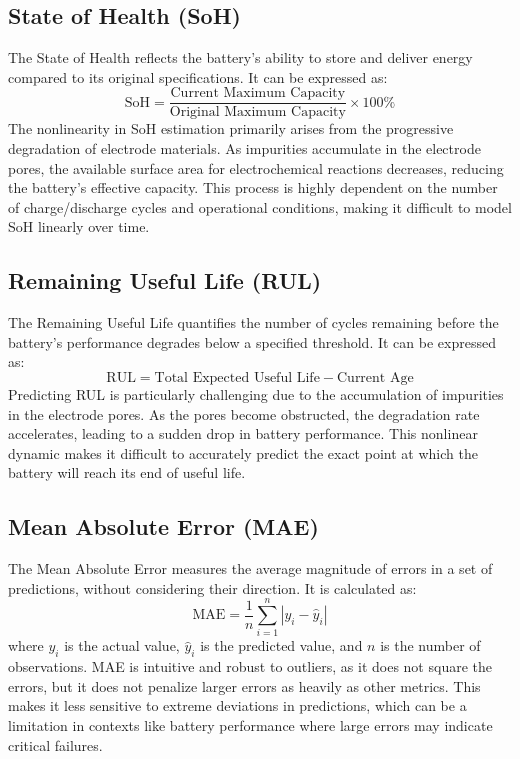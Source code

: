 \subsection{State of Health (SoH)}
The State of Health reflects the battery's ability to store and deliver energy compared to its original specifications. It can be expressed as:
\[
\text{SoH} = \frac{\text{Current Maximum Capacity}}{\text{Original Maximum Capacity}} \times 100\%
\]
The nonlinearity in SoH estimation primarily arises from the progressive degradation of electrode materials. As impurities accumulate in the electrode pores, the available surface area for electrochemical reactions decreases, reducing the battery's effective capacity. This process is highly dependent on the number of charge/discharge cycles and operational conditions, making it difficult to model SoH linearly over time.

\subsection{Remaining Useful Life (RUL)}
The Remaining Useful Life quantifies the number of cycles remaining before the battery's performance degrades below a specified threshold. It can be expressed as:
\[
\text{RUL} = \text{Total Expected Useful Life} - \text{Current Age}
\]
Predicting RUL is particularly challenging due to the accumulation of impurities in the electrode pores. As the pores become obstructed, the degradation rate accelerates, leading to a sudden drop in battery performance. This nonlinear dynamic makes it difficult to accurately predict the exact point at which the battery will reach its end of useful life.
\subsection{Mean Absolute Error (MAE)}
The Mean Absolute Error measures the average magnitude of errors in a set of predictions, without considering their direction. It is calculated as:
\begin{equation}
\text{MAE} = \frac{1}{n} \sum_{i=1}^{n} |y_i - \hat{y}_i|
\end{equation}
where $y_i$ is the actual value, $\hat{y}_i$ is the predicted value, and $n$ is the number of observations. MAE is intuitive and robust to outliers, as it does not square the errors, but it does not penalize larger errors as heavily as other metrics. This makes it less sensitive to extreme deviations in predictions, which can be a limitation in contexts like battery performance where large errors may indicate critical failures.


